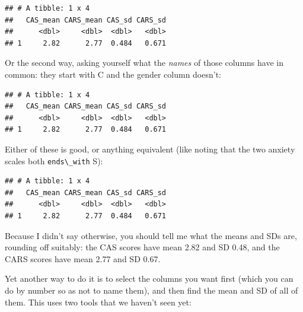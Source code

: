 \documentclass[]{tufte-book}
\newenvironment{Shaded}{}{}
\newcommand{\KeywordTok}[1]{\textcolor[rgb]{0.00,0.44,0.13}{\textbf{#1}}}
\newcommand{\NormalTok}[1]{#1}
\newcommand{\OperatorTok}[1]{\textcolor[rgb]{0.40,0.40,0.40}{#1}}
\newcommand{\StringTok}[1]{\textcolor[rgb]{0.25,0.44,0.63}{#1}}
\theoremstyle{definition}
\theoremstyle{definition}
\theoremstyle{definition}
\theoremstyle{remark}
\begin{document}
\begin{verbatim}
## # A tibble: 1 x 4
##   CAS_mean CARS_mean CAS_sd CARS_sd
##      <dbl>     <dbl>  <dbl>   <dbl>
## 1     2.82      2.77  0.484   0.671
\end{verbatim}

Or the second way, asking yourself what the \emph{names} of those
columns have in common: they start with C and the gender column doesn't:

\begin{Shaded}
\end{Shaded}

\begin{verbatim}
## # A tibble: 1 x 4
##   CAS_mean CARS_mean CAS_sd CARS_sd
##      <dbl>     <dbl>  <dbl>   <dbl>
## 1     2.82      2.77  0.484   0.671
\end{verbatim}

Either of these is good, or anything equivalent (like noting that the
two anxiety scales both \texttt{ends\textbackslash{}\_with} S):

\begin{Shaded}
\end{Shaded}

\begin{verbatim}
## # A tibble: 1 x 4
##   CAS_mean CARS_mean CAS_sd CARS_sd
##      <dbl>     <dbl>  <dbl>   <dbl>
## 1     2.82      2.77  0.484   0.671
\end{verbatim}

Because I didn't say otherwise, you should tell me what the means and
SDs are, rounding off suitably: the CAS scores have mean 2.82 and SD
0.48, and the CARS scores have mean 2.77 and SD 0.67.

Yet another way to do it is to select the columns you want first (which
you can do by number so as not to name them), and then find the mean and
SD of all of them. This uses two tools that we haven't seen yet:
\end{document}
